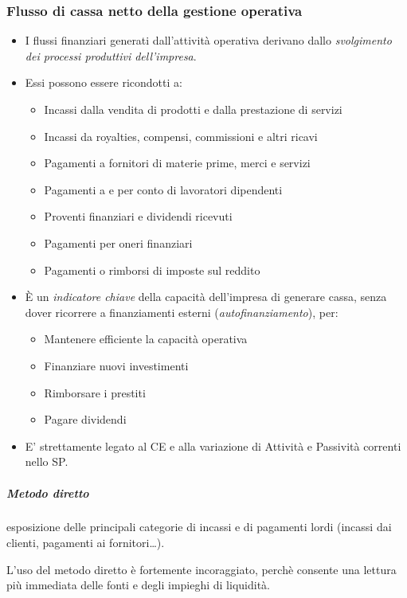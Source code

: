 \documentclass[10pt,a4paper,fleqn,oneside]{book}
\begin{document}
\subsubsection{Flusso di cassa netto della gestione operativa}

\begin{itemize}
\item I flussi finanziari generati dall’attività operativa derivano dallo
\emph{svolgimento dei processi produttivi dell’impresa}.
\item Essi possono essere ricondotti a:
\begin{itemize}
    \item Incassi dalla vendita di prodotti e dalla prestazione di servizi
    \item Incassi da royalties, compensi, commissioni e altri ricavi
    \item Pagamenti a fornitori di materie prime, merci e servizi
    \item Pagamenti a e per conto di lavoratori dipendenti
    \item Proventi finanziari e dividendi ricevuti
    \item Pagamenti per oneri finanziari
    \item Pagamenti o rimborsi di imposte sul reddito
\end{itemize}

\item È un \emph{indicatore chiave} della capacità dell’impresa di generare cassa,
senza dover ricorrere a finanziamenti esterni (\emph{autofinanziamento}), per:
\begin{itemize}
    \item Mantenere efficiente la capacità operativa
    \item Finanziare nuovi investimenti
    \item Rimborsare i prestiti
    \item Pagare dividendi
\end{itemize}

\item E’ strettamente legato al CE e alla variazione di Attività e Passività correnti
nello SP.
\end{itemize}

\subparagraph{Metodo diretto}
esposizione delle principali categorie di incassi e di
pagamenti lordi (incassi dai clienti, pagamenti ai fornitori\dots).

L'uso del metodo diretto è fortemente incoraggiato, perchè consente
una lettura più immediata delle fonti e degli impieghi di liquidità.
\end{document}
